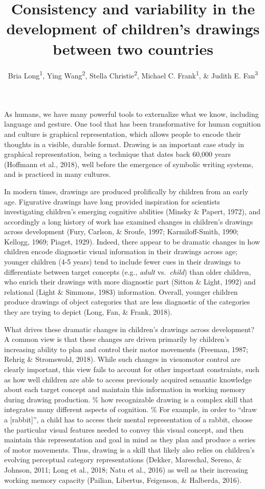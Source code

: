 \documentclass[
  english,
  man]{apa6}
\author{Bria Long\textsuperscript{1}, Ying Wang\textsuperscript{2}, Stella Christie\textsuperscript{2}, Michael C. Frank\textsuperscript{1}, \& Judith E. Fan\textsuperscript{3}}
\affiliation{
\vspace{0.5cm}
\textsuperscript{1} Stanford University\\\textsuperscript{2} Tsinghua University\\\textsuperscript{3} University of California, San Diego}
\title{Consistency and variability in the development of children's drawings between two countries}
\date{}
\begin{document}
\maketitle

As humans, we have many powerful tools to externalize what we know, including language and gesture.
One tool that has been transformative for human cognition and culture is graphical representation, which allows people to encode their thoughts in a visible, durable format.
Drawing is an important case study in graphical representation, being a technique that dates back 60,000 years (Hoffmann et al., 2018), well before the emergence of symbolic writing systems, and is practiced in many cultures.

In modern times, drawings are produced prolifically by children from an early age.
Figurative drawings have long provided inspiration for scientists investigating children's emerging cognitive abilities (Minsky \& Papert, 1972), and accordingly a long history of work has examined changes in children's drawings across development (Fury, Carlson, \& Sroufe, 1997; Karmiloff-Smith, 1990; Kellogg, 1969; Piaget, 1929).
Indeed, there appear to be dramatic changes in how children encode diagnostic visual information in their drawings across age; younger children (4-5 years) tend to include fewer cues in their drawings to differentiate between target concepts (e.g., \textit{adult} vs.~\textit{child}) than older children, who enrich their drawings with more diagnostic part (Sitton \& Light, 1992) and relational (Light \& Simmons, 1983) information.
Overall, younger children produce drawings of object categories that are less diagnostic of the categories they are trying to depict (Long, Fan, \& Frank, 2018).

What drives these dramatic changes in children's drawings across development?
A common view is that these changes are driven primarily by children's increasing ability to plan and control their motor movements (Freeman, 1987; Rehrig \& Stromswold, 2018).
While such changes in visuomotor control are clearly important, this view fails to account for other important constraints, such as how well children are able to access previously acquired semantic knowledge about each target concept and maintain this information in working memory during drawing production.
\% how recognizable drawing is a complex skill that integrates many different aspects of cognition.
\% For example, in order to \enquote{draw a {[}rabbit{]}}, a child has to access their mental representation of a rabbit, choose the particular visual features needed to convey this visual concept, and then maintain this representation and goal in mind as they plan and produce a series of motor movements.
Thus, drawing is a skill that likely also relies on children's evolving perceptual category representations (Dekker, Mareschal, Sereno, \& Johnson, 2011; Long et al., 2018; Natu et al., 2016) as well as their increasing working memory capacity (Pailian, Libertus, Feigenson, \& Halberda, 2016).
\end{document}
